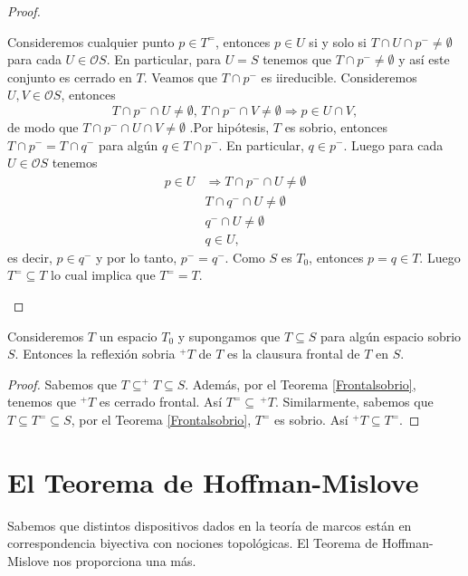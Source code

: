 \begin{proof}
\begin{description}
    Consideremos cualquier punto $p\in T^=$, entonces $p\in U$ si y solo si $T\cap U\cap p^-\neq \emptyset$ para cada $U\in \mathcal{O}S$. En particular, para $U=S$ tenemos que $T\cap p^-\neq \emptyset$ y así este conjunto es cerrado en $T$. Veamos que  $T\cap p^-$ es iireducible. Consideremos $U, V\in \mathcal{O}S$, entonces
    \[
    T\cap p^-\cap U\neq \emptyset,\, T\cap p^-\cap V\neq \emptyset \Rightarrow p\in U\cap V,
    \]
    de modo que $T\cap p^-\cap U\cap V\neq \emptyset$ .Por hipótesis, $T$ es sobrio, entonces $T\cap p^-=T\cap q^-$ para algún $q\in T\cap p^-$. En particular, $q\in p^-$. Luego para cada $U\in \mathcal{O}S$ tenemos 
    \[
    \begin{split}
        p\in U & \Rightarrow T\cap p^-\cap U\neq \emptyset\\
        & T\cap q^- \cap U\neq \emptyset\\
        & q^-\cap U\neq \emptyset\\
        & q\in U,
    \end{split}
    \]
    es decir, $p\in q^-$ y por lo tanto, $p^-=q^-$. Como $S$ es $T_0$, entonces $p=q\in T$. Luego $T^=\subseteq T$ lo cual implica que $T^==T$.
\end{description}
\end{proof}

\begin{cor}
    Consideremos $T$ un espacio $T_0$ y supongamos que $T\subseteq S$ para algún espacio sobrio $S$. Entonces la reflexión sobria $^+T$ de $T$ es la clausura frontal de $T$ en $S$.
\end{cor}

\begin{proof}
    Sabemos que $T\subseteq ^+ T\subseteq S$. Además, por el Teorema \ref{Frontalsobrio}, tenemos que $^+T$ es cerrado frontal. Así $T^=\subseteq\, ^+T$. Similarmente, sabemos que $T\subseteq T^=\subseteq S$, por el Teorema \ref{Frontalsobrio}, $T^=$ es sobrio. Así $^+T\subseteq T^=$.
\end{proof}

\section{El Teorema de Hoffman-Mislove}

Sabemos que distintos dispositivos dados en la teoría de marcos están en correspondencia biyectiva con nociones topológicas. El Teorema de Hoffman-Mislove nos proporciona una más.\\

